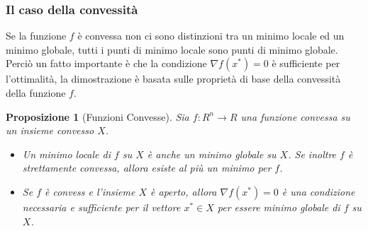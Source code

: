 \documentclass[a4paper, 12pt]{article}
\newtheorem{prop}{Proposizione}
\begin{document}
\subsubsection{Il caso della convessità}
Se la funzione $f$ è convessa non ci sono distinzioni tra un minimo locale ed un minimo globale, tutti i punti di minimo locale sono punti di minimo globale. Perciò un fatto importante è che la condizione $\nabla f(x^\ast) = 0$ è sufficiente per l'ottimalità, la dimostrazione è basata sulle proprietà di base della convessità della funzione $f$.
\begin{prop}[Funzioni Convesse] Sia $f:R^n \to R$ una funzione convessa su un insieme convesso $X$.
\begin{itemize}
  \item Un minimo locale di $f$ su $X$ è anche un minimo globale su $X$. Se inoltre $f$ è strettamente convessa, allora esiste al più un minimo per $f$.
  \item Se $f$ è convess e l'insieme $X$ è aperto, allora $\nabla f(x^\ast) = 0$ è una condizione necessaria e sufficiente per il vettore $x^\ast \in X$ per essere minimo globale di $f$ su $X$.
\end{itemize}
\end{prop}
\end{document}
